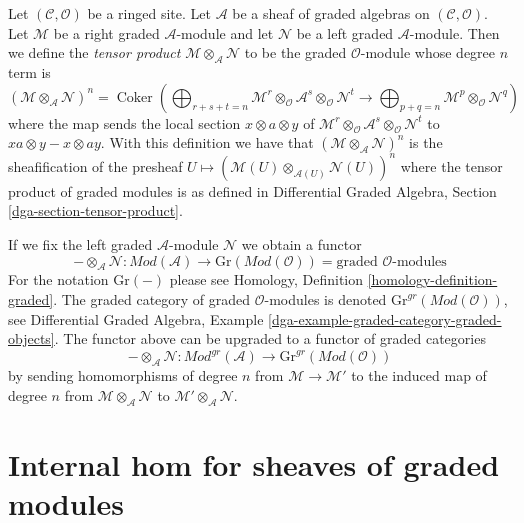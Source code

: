 \documentclass{stacks-project}
\theoremstyle{plain}
\theoremstyle{definition}
\theoremstyle{remark}
\numberwithin{equation}{subsection}
\def\Coker{\mathop{\mathrm{Coker}}}
\begin{document}
\medskip\noindent
Let $(\mathcal{C}, \mathcal{O})$ be a ringed site. Let $\mathcal{A}$
be a sheaf of graded algebras on $(\mathcal{C}, \mathcal{O})$.
Let $\mathcal{M}$ be a right graded $\mathcal{A}$-module
and let $\mathcal{N}$ be a left graded $\mathcal{A}$-module.
Then we define the {\it tensor product}
$\mathcal{M} \otimes_\mathcal{A} \mathcal{N}$
to be the graded $\mathcal{O}$-module whose degree $n$ term is
$$
(\mathcal{M} \otimes_\mathcal{A} \mathcal{N})^n =
\Coker\left(
\bigoplus\nolimits_{r + s + t = n} \mathcal{M}^r \otimes_\mathcal{O}
\mathcal{A}^s \otimes_\mathcal{O} \mathcal{N}^t
\longrightarrow
\bigoplus\nolimits_{p + q = n} \mathcal{M}^p \otimes_\mathcal{O} \mathcal{N}^q
\right)
$$
where the map sends the local section $x \otimes a \otimes y$
of $\mathcal{M}^r \otimes_\mathcal{O} \mathcal{A}^s
\otimes_\mathcal{O} \mathcal{N}^t$ to
$xa \otimes y - x \otimes ay$.
With this definition we have that
$(\mathcal{M} \otimes_\mathcal{A} \mathcal{N})^n$
is the sheafification of the presheaf
$U \mapsto (\mathcal{M}(U) \otimes_{\mathcal{A}(U)} \mathcal{N}(U))^n$
where the tensor product of graded modules is as defined in
Differential Graded Algebra, Section \ref{dga-section-tensor-product}.

\medskip\noindent
If we fix the left graded $\mathcal{A}$-module $\mathcal{N}$
we obtain a functor
$$
- \otimes_\mathcal{A} \mathcal{N} :
\textit{Mod}(\mathcal{A})
\longrightarrow
\text{Gr}(\textit{Mod}(\mathcal{O})) =
\text{graded }\mathcal{O}\text{-modules}
$$
For the notation $\text{Gr}(-)$ please see
Homology, Definition \ref{homology-definition-graded}.
The graded category of graded $\mathcal{O}$-modules is denoted
$\text{Gr}^{gr}(\textit{Mod}(\mathcal{O}))$, see
Differential Graded Algebra, Example
\ref{dga-example-graded-category-graded-objects}.
The functor above can be upgraded to a functor of graded categories
$$
- \otimes_\mathcal{A} \mathcal{N} :
\textit{Mod}^{gr}(\mathcal{A})
\longrightarrow
\text{Gr}^{gr}(\textit{Mod}(\mathcal{O}))
$$
by sending homomorphisms of degree $n$ from $\mathcal{M} \to \mathcal{M}'$
to the induced map of degree $n$ from
$\mathcal{M} \otimes_\mathcal{A} \mathcal{N}$ to
$\mathcal{M}' \otimes_\mathcal{A} \mathcal{N}$.






\section{Internal hom for sheaves of graded modules}
\label{section-internal-hom-graded}
\end{document}
